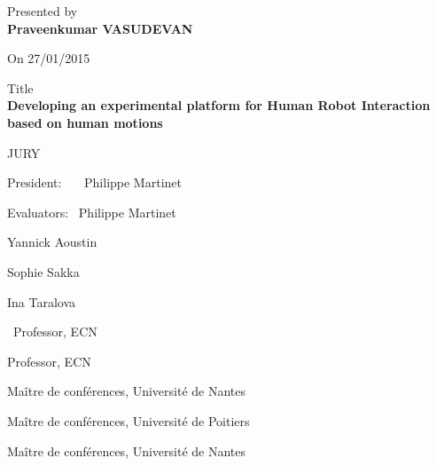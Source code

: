 \begin{titlepage}
\begin{center}
	\normalsize Presented by\\
	\vspace{0.1in}
	{\large \textbf{Praveenkumar VASUDEVAN}}
	\par
	\vspace{0.1in}
	On 27/01/2015
	\par
	\vspace{0.3in}
	\large Title\\
	\vspace{0.1in}
	\large \textbf{Developing an experimental platform for Human Robot Interaction based on human motions}
	\par
	\vspace{0.4in}
	\normalsize JURY %
	\end{center}
	\par
	\vspace{0.2in}
	\noindent \begin{minipage}{0.5\textwidth}
	\begin{flushleft} 
	President: \  \  \ Philippe Martinet
	\par
	\vspace{0.2in}	
	Evaluators: \ Philippe Martinet
	\par
	\hspace{18.5mm} Yannick Aoustin
	\par
	\hspace{18.5mm} Sophie Sakka
	\par
	\hspace{18.5mm} Ina Taralova
	\par
	\end{flushleft}
	\end{minipage}
	\begin{minipage}{0.55\textwidth}
	\begin{flushleft} 
	\
	Professor, ECN
	\par
	\vspace{0.2in}	
	Professor, ECN
	\par
	Ma\^{i}tre de conf\'{e}rences, Universit\'{e} de Nantes
	\par
	Ma\^{i}tre de conf\'{e}rences, Universit\'{e} de Poitiers	
	\par
	Ma\^{i}tre de conf\'{e}rences, Universit\'{e} de Nantes
	\end{flushleft}
	\end{minipage}
	\\
	\par
	\vspace{0.1in}	

\end{titlepage}
